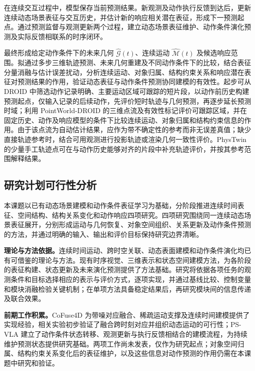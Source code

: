 在连续交互过程中，模型保存当前预测结果。新观测及动作执行反馈到达后，更新连续动态场景表征与交互历史，并估计新的响应相关潜在表征，形成下一预测起点。通过预测监督与观测更新两个过程，建立动态场景表征维护、动作条件演化预测及实际反馈相联系的时序闭环。

最终形成给定动作条件下的未来几何 $\widehat{\mathcal{G}}(t)$、连续运动 $\widehat{\mathcal{M}}(t)$ 及候选响应范围。拟通过多步三维轨迹预测、未来几何重建及不同动作条件下的比较，结合表征分量消融与估计误差扰动，分析连续运动、对象归属、结构约束关系和响应潜在表征对预测结果的作用，验证动态表征与动作条件预测协同建模的有效性。起步可从 DROID\cite{droid2024} 中筛选动作记录明确、主要运动区域可跟踪的短片段，以动作前历史构建预测起点，仅输入记录的后续动作，先评价短时轨迹与几何预测，再逐步延长预测时域；利用 PointWorld-DROID\cite{ref06} 的三维点流及有效性标记评价可跟踪区域，并在固定历史、动作及响应模型的条件下比较连续运动、对象归属和结构约束信息的作用。由于该点流为自动估计结果，应作为带不确定性的参考而非无误差真值；缺少直接轨迹参考时，结合可用观测进行投影轨迹或渲染几何一致性评价。PhysTwin\cite{phystwin2025} 的少量手工轨迹点可在与动作历史能够对齐的片段中补充轨迹评价，并按其参考范围解释结果。


\subsection{研究计划可行性分析}

本课题以已有动态场景建模和动作条件表征学习为基础，分阶段推进连续时间表征、空间结构、结构关系变化和动作响应四项研究。四项研究围绕同一连续动态场景表征展开，分别形成运动与几何恢复、对象空间组织、关系更新及动作条件预测的方法，并通过明确的输入、输出和评价目标保持研究边界清晰。

\textbf{理论与方法依据。}连续时间运动、跨时空关联、动态表面建模和动作条件演化均已有可借鉴的理论与方法。现有时序视觉、三维表示和状态空间建模方法，为各阶段的表征构建、状态更新及未来演化预测提供了方法基础。研究将依据各项任务的观测条件和目标选择相应的表示与评价方式，逐项实现，并通过基线比较、控制变量和模块消融检验关键机制；在单项方法具备稳定结果后，再研究模块间的信息传递及联合效果。

\textbf{前期工作积累。}CoFuse4D 为带噪对应融合、稀疏运动支撑及连续时间建模提供了实现经验，相关实验初步验证了融合跨时刻对应并组织动态运动的可行性；PS-VLA 建立了动作条件状态转移、观测更新与执行反馈相结合的建模流程，为持续维护预测状态提供研究基础。两项工作尚未发表，仅作为研究起点；对象空间归属、结构约束关系变化后的表征维护，以及这些信息对动作预测的作用仍需在本课题中研究和验证。

